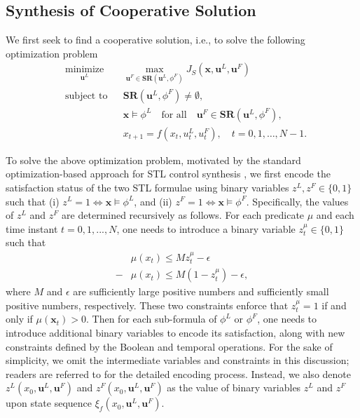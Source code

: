 \documentclass[letterpaper, 10 pt, conference]{ieeeconf}
\begin{document}
\subsection{Synthesis of Cooperative Solution}
%
We first seek to find a cooperative solution, i.e., to solve the following optimization problem
\begin{subequations}\label{equation-5}
\begin{align}
& \underset{\mathbf{u}^L}{\text{minimize}} & & \max_{\mathbf{u}^F \in \mathbf{SR}(\mathbf{u}^L, \phi^F)} J_S(\mathbf{x}, \mathbf{u}^L, \mathbf{u}^F) \\
& \text{subject to} & & \mathbf{SR}(\mathbf{u}^L, \phi^F) \ne \emptyset, \label{cons-5b} \\
& & & \mathbf{x} \models \phi^L \quad \text{for all} \quad \mathbf{u}^F \in \mathbf{SR}(\mathbf{u}^L, \phi^F), \label{cons-5c} \\
& & &x_{t+1} = f(x_t, u^L_t, u^F_t), \quad t = 0, 1, \dots, N-1.\nonumber
\end{align}  
\end{subequations}

To solve the above optimization problem, motivated by the standard optimization-based approach for STL control synthesis \cite{raman2014model, kurtz2022mixed}, 
we first encode the satisfaction status of the two STL formulae using binary variables $z^L,z^F\in \{0,1\}$ such that
(i) $z^L=1 \Leftrightarrow \mathbf{x}\models \phi^L$, and
(ii) $z^F=1 \Leftrightarrow \mathbf{x}\models \phi^F$.  
Specifically,  the values of  $z^L$ and $z^F$ are determined recursively as follows.  
For each predicate $\mu$ and each time instant $t=0,1,...,N$, one needs to  introduce a binary variable  $z^\mu_t\in \{0,1\}$ such that
\begin{subequations}
    \begin{align}
        & \mu(x_t)\leq M z^\mu_t-\epsilon\nonumber\\
        -& \mu(x_t)\leq M (1-z^\mu_t)-\epsilon, \nonumber
    \end{align}
\end{subequations}
where $M$ and $\epsilon$ are sufficiently large positive numbers and sufficiently small positive numbers, respectively.  These two constraints enforce that $z^\mu_t=1$ if and only if $\mu(\mathbf{x}_t)>0$. 
Then for each sub-formula  of $\phi^L$ or $\phi^F$, one needs to introduce additional binary variables to encode its satisfaction, along with new constraints defined by the Boolean and temporal operations. 
For the sake of simplicity, we omit the intermediate variables and constraints in this discussion; readers are referred to \cite{raman2014model} for the  detailed  encoding process.
Instead, 
we also denote $z^L(x_0,\mathbf{u}^L,\mathbf{u}^F)$ and $z^F(x_0,\mathbf{u}^L,\mathbf{u}^F)$ as the value of binary variables $z^L$ and $z^F$ upon state sequence $\xi_f(x_0,\mathbf{u}^L,\mathbf{u}^F)$.
\end{document}
